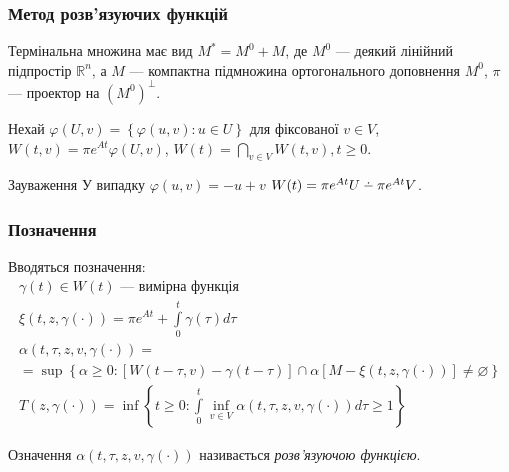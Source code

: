 \documentclass[10pt,pdf,aspectratio=169]{beamer}
\newcommand{\R}{\mathbb{R}}
\newcommand{\vf}{\varphi}
\renewcommand{\l}{\left}
\renewcommand{\r}{\right}
\newcommand{\intl}{\int\limits}
\def\setdif{\mathbin{\ooalign{\hss\raise1ex\hbox{.}\hss\cr
  \mathsurround=0pt$-$}}}
\begin{document}
    \begin{frame}
        \frametitle{Метод розв’язуючих функцій}
    
        Термінальна множина має вид $M^* = M^0 + M$, де
        $M^0$ --- деякий лінійний підпростір $\R^n$, а $M$ --- компактна підмножина ортогонального доповнення $M^0$,
        $\pi$ --- проектор на $(M^0)^\perp$.

        Нехай $\vf(U, v) = \l\{\vf(u,v) : u \in U\r\}$ для фіксованої $v \in V$,
        $W(t, v) = \pi e^{At} \vf(U, v)$,
        $W(t) = \bigcap\limits_{v \in V} W(t, v), t\geq 0$. 
        \begin{block}{Зауваження}
            У випадку $\vf(u,v) = -u + v$ $W(t) = \pi e^{At}U \setdif \pi e^{At} V$.
        \end{block}
    
    \end{frame}
    \begin{frame}
        \frametitle{Позначення}
    
        Вводяться позначення:
        \begin{gather*}
            \gamma(t) \in W(t) \text{ --- вимірна функція} \\
            \xi(t, z, \gamma(\cdot)) = \pi e^{A t} + \intl_0^t \gamma(\tau) d\tau \\
            \alpha(t, \tau, z, v, \gamma(\cdot)) = \\ = \sup\l\{ 
                \alpha \geq 0 : \l[ W(t-\tau, v) - \gamma(t-\tau)\r] \cap \alpha
                \l[M - \xi(t, z, \gamma(\cdot))\r] \neq \varnothing
            \r\} \\
            T(z, \gamma(\cdot)) = \inf \l\{ 
                t\geq 0: \intl_0^t \underset{v\in V}{\inf} \alpha(t, \tau, z, v, \gamma(\cdot)) d\tau \geq 1
            \r\}
        \end{gather*}

        \begin{block}{Означення}
            $\alpha(t, \tau, z, v, \gamma(\cdot))$ називається \emph{розв'язуючою функцією}.
        \end{block}
    \end{frame}
\end{document}
